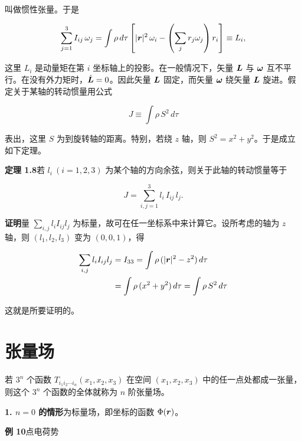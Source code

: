 叫做惯性张量。于是

\begin{equation*}
\sum_{j=1}^{3} I_{ij}\, \omega_j = \int \rho\, d\tau \left[|\bm{r}|^{2}\, \omega_i - \left(\sum_{j} r_j \omega_j\right) r_i\right] \equiv L_i,
\end{equation*}

这里 $L_i$ 是动量矩在第 $i$ 坐标轴上的投影。在一般情况下，矢量 $\bm{L}$ 与 $\bm{\omega}$ 互不平行。在没有外力矩时，$\dot{\bm{L}} = 0$。因此矢量 $\bm{L}$ 固定，而矢量 $\bm{\omega}$ 绕矢量 $\bm{L}$ 旋进。假定关于某轴的转动惯量用公式

\begin{equation*}
J \equiv \int \rho\, S^{2}\, d\tau
\end{equation*}

表出，这里 $S$ 为到旋转轴的距离。特别，若绕 $z$ 轴，则 $S^{2} = x^{2} + y^{2}$。于是成立如下定理。

\textbf{定理 1.8}\quad 若 $l_i\ (i = 1, 2, 3)$ 为某个轴的方向余弦，则关于此轴的转动惯量等于

\begin{equation*}
J = \sum_{i,j=1}^{3} l_i\, I_{ij}\, l_j.
\end{equation*}

\textbf{证明}\quad 量 $\sum_{i,j} l_i I_{ij} l_j$ 为标量，故可在任一坐标系中来计算它。设所考虑的轴为 $z$ 轴，则 $(l_1, l_2, l_3)$ 变为 $(0, 0, 1)$，得

\begin{equation*}
\begin{aligned}
\sum_{i,j} l_i I_{ij} l_j &= I_{33} = \int \rho\, (|\bm{r}|^{2} - z^{2})\, d\tau\\
&= \int \rho\, (x^{2} + y^{2})\, d\tau = \int \rho\, S^{2}\, d\tau
\end{aligned}
\end{equation*}

这就是所要证明的。

\section{张量场}

若 $3^{n}$ 个函数 $T_{i_1 i_2 \cdots i_n}(x_1, x_2, x_3)$ 在空间 $(x_1, x_2, x_3)$ 中的任一点处都成一张量，则这个 $3^{n}$ 个函数的全体就称为 $n$ 阶张量场。

\textbf{1. $n = 0$ 的情形}\quad 为标量场，即坐标的函数 $\Phi(\bm{r})$。

\textbf{例 10}\quad 点电荷势

